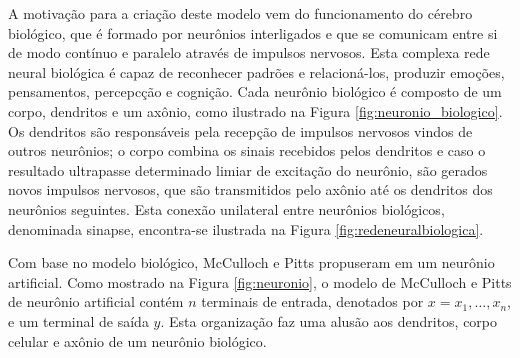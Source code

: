 A motivação para a criação deste modelo vem do funcionamento do cérebro biológico, que é formado por neurônios interligados e que se comunicam entre si de modo contínuo e paralelo através de impulsos nervosos. Esta complexa rede neural biológica é capaz de reconhecer padrões e relacioná-los, produzir emoções, pensamentos, percepcção e cognição. Cada neurônio biológico é composto de um corpo, dendritos e um axônio, como ilustrado na Figura \ref{fig:neuronio_biologico}. Os dendritos são responsáveis pela recepção de impulsos nervosos vindos de outros neurônios; o corpo combina os sinais recebidos pelos dendritos e caso o resultado ultrapasse determinado limiar de excitação do neurônio, são gerados novos impulsos nervosos, que são transmitidos pelo axônio até os dendritos dos neurônios seguintes. Esta conexão unilateral entre neurônios biológicos, denominada sinapse, encontra-se ilustrada na Figura \ref{fig:redeneuralbiologica}.

Com base no modelo biológico, McCulloch e Pitts propuseram em \cite{mcculloch1943logical} um neurônio artificial. Como mostrado na Figura \ref{fig:neuronio}, o modelo de McCulloch e Pitts de neurônio artificial contém $n$ terminais de entrada, denotados por $x = x_1, \ldots, x_n$, e um terminal de saída $y$. Esta organização faz uma alusão aos dendritos, corpo celular e axônio de um neurônio biológico.

